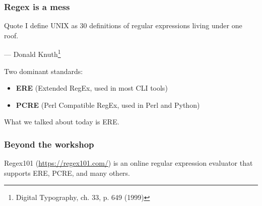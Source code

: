 \begin{frame}
\frametitle{Regex is a mess}
\begin{block}{Quote}
I define UNIX as 30 definitions of regular expressions living under one roof.
\begin{flushright}
    — Donald Knuth\footnote{Digital Typography, ch. 33, p. 649 (1999)}
\end{flushright}
\end{block}

Two dominant standards:
\begin{itemize}
    \item \textbf{ERE} (Extended RegEx, used in most CLI tools)
    \item \textbf{PCRE} (Perl Compatible RegEx, used in Perl and Python)
\end{itemize}
What we talked about today is ERE.
\end{frame}
\begin{frame}
\frametitle{Beyond the workshop}
Regex101 (\url{https://regex101.com/}) is an online regular expression
evaluator that supports ERE, PCRE, and many others.
\end{frame}
